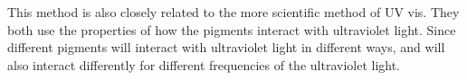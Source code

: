 \documentclass[10pt]{armath}
\begin{document}
This method is also closely related to the more scientific method of UV vis.
They both use the properties of how the pigments interact with ultraviolet
light. Since different pigments will interact with ultraviolet light in
different ways, and will also interact differently for different frequencies of
the ultraviolet light.
\end{document}
